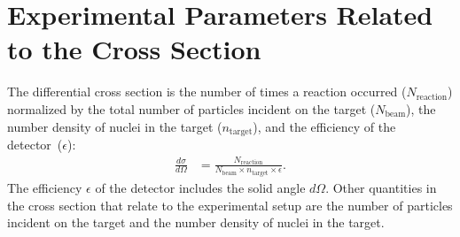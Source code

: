\section{Experimental Parameters Related to the Cross Section}

The differential cross section is the number of times a reaction occurred ($N_{\text{reaction}}$) normalized by the total number of particles incident on the target ($N_{\text{beam}}$), the number density of nuclei in the target ($n_{\text{target}}$), and the {efficiency of the detector}~($\epsilon$):
\begin{align}
\frac{d\sigma}{d\Omega} &= \frac{N_{\text{reaction}}}{N_{\text{beam}} \times n_{\text{target}} \times \epsilon}.
\label{eq:cross_section}
\end{align}
The efficiency $\epsilon$ of the detector includes the solid angle $d\Omega$.  Other quantities in the cross section that relate to the experimental setup are the number of particles incident on the target and the number density of nuclei in the target.


